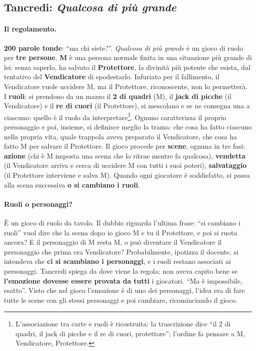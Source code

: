 \subsection{Tancredi: \emph{Qualcosa di più grande}}
\label{a6:sec:piugrande}

\paragraph{Il regolamento.} \textbf{200 parole tonde}: ``ma chi siete?''. \emph{Qualcosa
di più grande} è un gioco di ruolo per \textbf{tre persone}. \textbf{M} è una persona
normale finita in una situazione più grande di lei: senza saperlo, ha salvato il
\textbf{Protettore}, la divinità più potente che esista, dal tentativo del
\textbf{Vendicatore} di spodestarlo. Infuriato per il fallimento, il Vendicatore vuole
uccidere M, ma il Protettore, riconoscente, non lo permetterà. I \textbf{ruoli}: si
prendono da un mazzo il \textbf{2 di quadri} (M), il \textbf{jack di picche} (il
Vendicatore) e il \textbf{re di cuori} (il Protettore), si mescolano e se ne consegna
una a ciascuno: quello è il ruolo da interpretare\footnote{L'associazione tra carte e
ruoli è ricostruita: la trascrizione dice ``il 2 di quadri, il jack di picche e il re
di cuori, protettore''; l'ordine fa pensare a M, Vendicatore, Protettore.}. Ognuno
caratterizza il proprio personaggio e poi, insieme, si definisce meglio la trama: che
cosa ha fatto ciascuno nella propria vita, quale trappola aveva preparato il
Vendicatore, che cosa ha fatto M per salvare il Protettore. Il gioco procede per
\textbf{scene}, ognuna in tre fasi: \textbf{azione} (chi è M imposta una scena che lo
ritrae mentre fa qualcosa), \textbf{vendetta} (il Vendicatore arriva e cerca di
uccidere M con tutti i suoi poteri), \textbf{salvataggio} (il Protettore interviene e
salva M). Quando ogni giocatore è soddisfatto, si passa alla scena successiva
\textbf{o si cambiano i ruoli}.

\paragraph{Ruoli o personaggi?} È un gioco di ruolo da tavolo. Il dubbio riguarda
l'ultima frase: ``si cambiano i ruoli'' vuol dire che la scena dopo io gioco M e tu il
Protettore, e poi si ruota ancora? E il personaggio di M resta M, o può diventare il
Vendicatore il personaggio che prima era Vendicatore? Probabilmente, ipotizza il
docente, si intendeva che \textbf{ci si scambiano i personaggi}, e i ruoli restano
associati ai personaggi. Tancredi spiega da dove viene la regola: non aveva capito
bene se \textbf{l'emozione dovesse essere provata da tutti} i giocatori. ``Ma è
impossibile, esatto''. Visto che nel gioco l'emozione è di uno dei personaggi, l'idea
era di fare tutte le scene con gli stessi personaggi e poi cambiare, ricominciando il
gioco.

